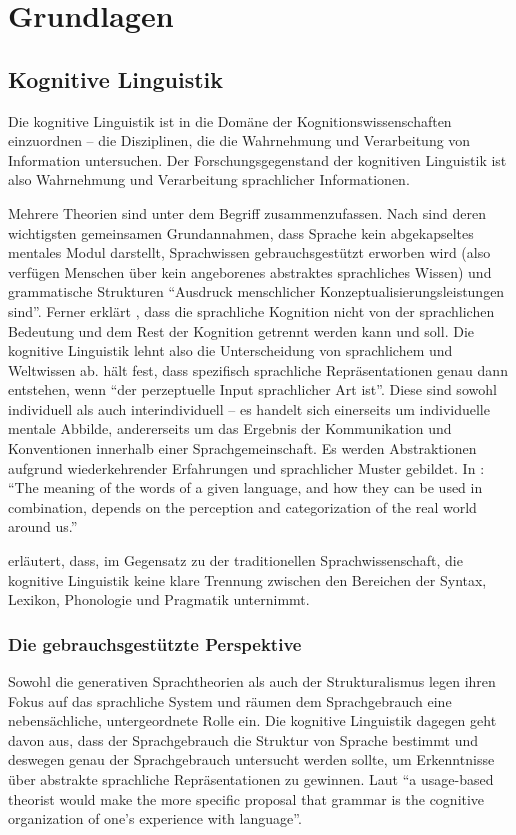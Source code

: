 \section{Grundlagen}

\subsection{Kognitive Linguistik}

Die kognitive Linguistik ist in die Domäne der Kognitionswissenschaften einzuordnen -- die Disziplinen, die die Wahrnehmung und Verarbeitung von Information untersuchen.
Der Forschungsgegenstand der kognitiven Linguistik ist also Wahrnehmung und Verarbeitung sprachlicher Informationen.

Mehrere Theorien sind unter dem Begriff zusammenzufassen.
Nach \cite{Ziem13} sind deren wichtigsten gemeinsamen Grundannahmen, dass Sprache kein abgekapseltes mentales Modul darstellt,
Sprachwissen gebrauchsgestützt erworben wird (also verfügen Menschen über kein angeborenes abstraktes sprachliches Wissen)
und grammatische Strukturen ``Ausdruck menschlicher Konzeptualisierungsleistungen sind''.
Ferner erklärt \cite{Ellis08}, dass die sprachliche Kognition nicht von der sprachlichen Bedeutung und dem Rest der Kognition getrennt werden kann und soll.
Die kognitive Linguistik lehnt also die Unterscheidung von sprachlichem und Weltwissen ab.
\cite{Ziem08} hält fest, dass spezifisch sprachliche Repräsentationen genau dann entstehen, wenn ``der perzeptuelle Input sprachlicher Art ist''.
Diese sind sowohl individuell als auch interindividuell -- es handelt sich einerseits um individuelle mentale Abbilde, andererseits um das Ergebnis der Kommunikation und Konventionen innerhalb einer Sprachgemeinschaft.
Es werden Abstraktionen aufgrund wiederkehrender Erfahrungen und sprachlicher Muster gebildet.
In \cite{Ellis08}: ``The meaning of the words of a given language, and how they can be used in combination, depends on the perception and categorization of the real world around us.''

\cite{Ellis08} erläutert, dass, im Gegensatz zu der traditionellen Sprachwissenschaft, die kognitive Linguistik keine klare Trennung zwischen den Bereichen der Syntax, Lexikon, Phonologie und Pragmatik unternimmt.

\subsubsection{Die gebrauchsgestützte Perspektive}
Sowohl die generativen Sprachtheorien als auch der Strukturalismus legen ihren Fokus auf das sprachliche System und räumen dem Sprachgebrauch eine nebensächliche, untergeordnete Rolle ein.
Die kognitive Linguistik dagegen geht davon aus, dass der Sprachgebrauch die Struktur von Sprache bestimmt und deswegen genau der Sprachgebrauch untersucht werden sollte, um Erkenntnisse über abstrakte sprachliche Repräsentationen zu gewinnen.
Laut \cite{Bybee06} ``a usage-based theorist would make the more specific proposal that grammar is the cognitive organization of one’s experience with language''.

